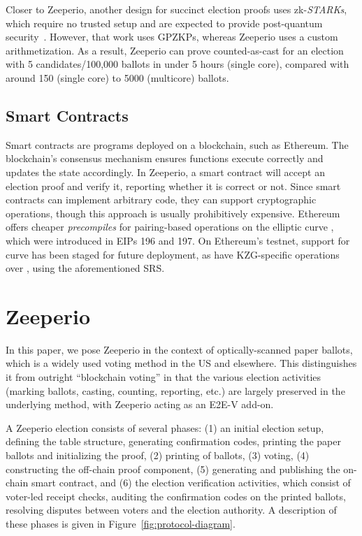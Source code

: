 Closer to Zeeperio, another design for succinct election proofs uses zk-{\em STARKs}, which require no trusted setup and are expected to provide post-quantum security~\cite{HT25}. However, that work uses GPZKPs, whereas Zeeperio uses a custom arithmetization. As a result, Zeeperio can prove counted-as-cast for an election with 5 candidates/100,000 ballots in under 5 hours (single core), compared with around 150 (single core) to 5000 (multicore) ballots.






\subsection{Smart Contracts}

Smart contracts are programs deployed on a blockchain, such as Ethereum.
The blockchain's consensus mechanism ensures functions execute correctly and updates the state accordingly.
In Zeeperio, a smart contract will accept an election proof and verify it, reporting whether it is correct or not.
Since smart contracts can implement arbitrary code, they can support cryptographic operations, though this approach is usually prohibitively expensive.
Ethereum offers cheaper \emph{precompiles} for pairing-based operations on the elliptic curve \altbn, which were introduced in EIPs 196 and 197.
On Ethereum's testnet, support for curve \bls has been staged for future deployment, as have KZG-specific operations over \bls, using the aforementioned SRS.

\section{Zeeperio}
\label{sec:constraints}

In this paper, we pose Zeeperio in the context of optically-scanned paper ballots, which is a widely used voting method in the US and elsewhere. This distinguishes it from outright ``blockchain voting'' in that the various election activities (marking ballots, casting, counting, reporting, etc.) are largely preserved in the underlying method, with Zeeperio acting as an E2E-V add-on.

A Zeeperio election consists of several phases: (1) an initial election setup, defining the table structure, generating confirmation codes, printing the paper ballots and initializing the proof, (2) printing of ballots, (3) voting, (4) constructing the off-chain proof component, (5) generating and publishing the on-chain smart contract, and (6) the election verification activities, which consist of voter-led receipt checks, auditing the confirmation codes on the printed ballots, resolving disputes between voters and the election authority. A description of these phases is given in Figure~\ref{fig:protocol-diagram}.

